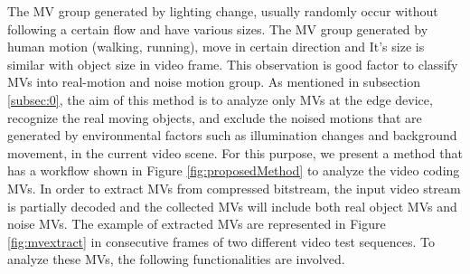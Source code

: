 The MV group generated by lighting change, usually randomly occur without following a certain flow and have various sizes. The MV group generated by human motion (walking, running),  move in certain direction and It’s size is similar with object size in video frame. This observation is good factor to classify MVs into real-motion and noise motion group. As mentioned in subsection \ref{subsec:0}, the aim of this method is to analyze only MVs at the edge device, recognize the real moving objects, and exclude the noised motions that are generated by environmental factors such as illumination changes and background movement, in the current video scene. For this purpose, we present a method that has a workflow shown in Figure \ref{fig:proposedMethod} to analyze the video coding MVs. In order to extract MVs from compressed bitstream, the input video stream is partially decoded and the collected MVs will include both real object MVs and noise MVs. The example of extracted MVs are represented in Figure \ref{fig:mvextract} in consecutive frames of two different video test sequences. To analyze these MVs, the following functionalities are involved.
